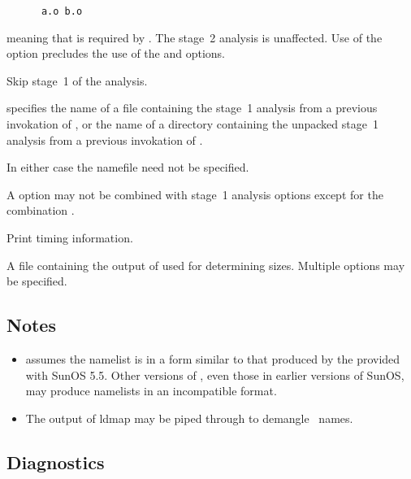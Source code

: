\begin{description}
   \begin{verbatim}
      a.o b.o
   \end{verbatim}

   \noindent
   meaning that  is required by .  The stage~2 analysis is
   unaffected.  Use of the  option precludes the use of the 
   and  options.

\item[\code{\exe{-s} file | \exe{-S} directory}]
   Skip stage~1 of the analysis.

    specifies the name of a file containing the stage~1 analysis from
   a previous invokation of , or the name of a directory
   containing the unpacked stage~1 analysis from a previous invokation of
   .

   In either case the namefile need not be specified.

   A  option may not be combined with stage~1 analysis options except
   for the combination .

\item[\exe{-t}]
   Print timing information.

\item[\code{\exe{-v} file}]
   A file containing the output of  used for determining sizes.
   Multiple  options may be specified.
\end{description}
 
\subsection*{Notes}
 
\begin{itemize}
\item
    assumes the namelist is in a form similar to that produced by
   the  provided with SunOS 5.5.  Other versions of ,
   even those in earlier versions of SunOS, may produce namelists in an
   incompatible format.

\item
   The output of ldmap may be piped through  to demangle
   \cplusplus\ names.
\end{itemize}
 
\subsection*{Diagnostics}
 

